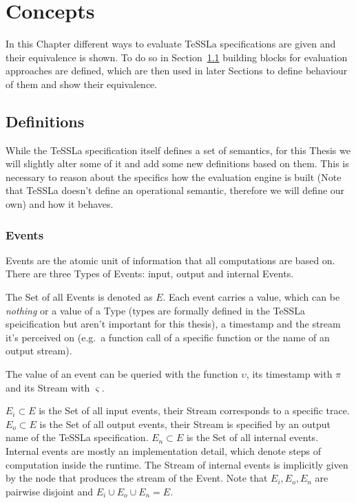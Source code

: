\chapter{Concepts}
\label{sec:concepts}

In this Chapter different ways to evaluate TeSSLa specifications are given and their equivalence is shown.
To do so in Section~\ref{sec:concepts:defs} building blocks for evaluation approaches are defined, which are then used in later Sections to define behaviour of them and show their equivalence.

\section{Definitions}
\label{sec:concepts:defs}

While the TeSSLa specification itself defines a set of semantics, for this Thesis we will slightly alter some of it and add some new definitions based on them.
This is necessary to reason about the specifics how the evaluation engine is built (Note that TeSSLa doesn't define an operational semantic, therefore we will define our own) and how it behaves.

\subsection{Events}
\label{sec:concepts:defs:events}

Events are the atomic unit of information that all computations are based on.
There are three Types of Events: input, output and internal Events.

The Set of all Events is denoted as \(E\).
Each event carries a value, which can be \emph{nothing} or a value of a Type (types are formally defined in the TeSSLa speicification but aren't important for this thesis), a timestamp and the stream it's perceived on (e.g.\ a function call of a specific function or the name of an output stream).

The value of an event can be queried with the function \(\upsilon\), its timestamp with \(\pi\) and its Stream with \(\varsigma\).

\(E_i \subset E\) is the Set of all input events, their Stream corresponds to a specific trace.
\(E_o \subset E\) is the Set of all output events, their Stream is specified by an output name of the TeSSLa specification.
\(E_n \subset E\) is the Set of all internal events.
Internal events are mostly an implementation detail, which denote steps of computation inside the runtime.
The Stream of internal events is implicitly given by the node that produces the stream of the Event.
Note that \(E_i, E_o, E_n\) are pairwise disjoint and \(E_i \cup E_o \cup E_n = E\).

